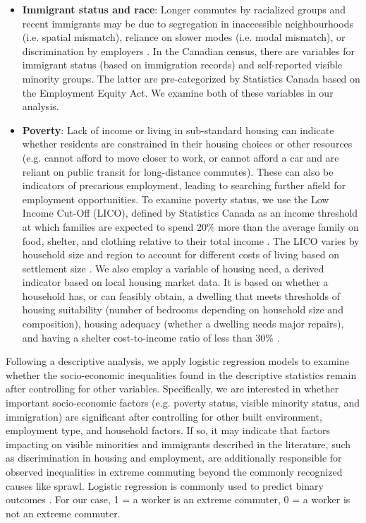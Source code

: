 \documentclass[10 pt,letterpaper]{article}
\begin{document}
\begin{itemize}
	\item \textbf{Immigrant status and race}: Longer commutes by racialized groups and recent immigrants may be due to segregation in inaccessible neighbourhoods (i.e. spatial mismatch), reliance on slower modes (i.e. modal mismatch), or discrimination by employers  \cite{marion_comparison_2007,preston_revisiting_2016,newbold_immigrant_2017,mclafferty_who_2019}. In the Canadian census, there are variables for immigrant status (based on immigration records) and  self-reported visible minority groups. The latter are pre-categorized by Statistics Canada based on the Employment Equity Act. We examine both of these variables in our analysis.
	
	\item \textbf{Poverty}: Lack of income or living in sub-standard housing can indicate whether residents are constrained in their housing choices or other resources (e.g. cannot afford to move closer to work, or cannot afford a car and are reliant on public transit for long-distance commutes). These can also be indicators of precarious employment, leading to searching further afield for employment opportunities. To examine poverty status, we use the Low Income Cut-Off (LICO), defined by Statistics Canada as an income threshold at which families are expected to spend 20\% more than the average family on food, shelter, and clothing relative to their total income \cite{government_of_canada_individuals_2016}. The LICO varies by household size and region to account for different costs of living based on settlement size \cite{government_of_canada_individuals_2016}. We also employ a variable of housing need, a derived indicator based on local housing market data. It is based on whether a household has, or can feasibly obtain, a dwelling that meets thresholds of housing suitability (number of bedrooms depending on household size and composition), housing adequacy (whether a dwelling needs major repairs), and having a shelter cost-to-income ratio of less than 30\% \cite{government_of_canada_core_2017}. 
	
\end{itemize}
Following a descriptive analysis, we apply logistic regression models to examine whether the socio-economic inequalities found in the descriptive statistics remain after controlling for other variables. Specifically, we are interested in whether important socio-economic factors (e.g. poverty status, visible minority status, and immigration) are significant after controlling for other built environment, employment type, and household factors. If so, it may indicate that factors impacting on visible minorities and immigrants described in the literature, such as discrimination in housing and employment, are additionally responsible for observed inequalities in extreme commuting beyond the commonly recognized causes like sprawl. Logistic regression is commonly used to predict binary outcomes \cite{pampel2020logistic}. For our case, 1 = a worker is an extreme commuter, 0 = a worker is not an extreme commuter. 
\end{document}
